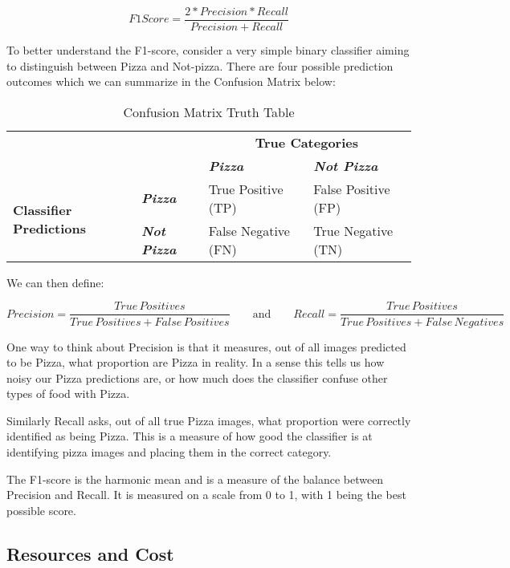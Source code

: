 \documentclass[10pt,a4paper]{article}
\begin{document}
\[F1 Score = \frac{2 * Precision * Recall}{Precision + Recall}\]

To better understand the F1-score, consider a very simple binary classifier aiming to distinguish between Pizza and Not-pizza. There are four possible prediction outcomes which we can summarize in the Confusion Matrix below:

	\begin{table}[h]
	\small
	\setlength\extrarowheight{7pt}
    \begin{tabular}{ p{2.8cm} l l l}  
    ~                      & ~         & \multicolumn{2}{c}{\textbf{True Categories}} \\
    ~                      & ~         & \textbf{\textit{Pizza}}	& \textbf{\textit{Not Pizza}} \\
    \hline
    \multirow{2}{2.8cm}{\textbf{Classifier Predictions}} & \textbf{\textit{Pizza}} & True Positive (TP)  & False Positive (FP) \\
                        & \textbf{\textit{Not Pizza}} & False Negative (FN) & True Negative (TN)  \\
	\hline    
    \end{tabular}
    \caption{Confusion Matrix Truth Table}
    \end{table}

We can then define:

\[
Precision = \frac{True\, Positives}{True\, Positives + False\, Positives}
\qquad\text{and}\qquad
Recall = \frac{True\, Positives}{True\, Positives + False\, Negatives}
\]

One way to think about Precision is that it measures, out of all images predicted to be Pizza, what proportion are Pizza in reality. In a sense this tells us how noisy our Pizza predictions are, or how much does the classifier confuse other types of food with Pizza.

Similarly Recall asks, out of all true Pizza images, what proportion were correctly identified as being Pizza. This is a measure of how good the classifier is at identifying pizza images and placing them in the correct category.

The F1-score is the harmonic mean and is a measure of the balance between Precision and Recall. It is measured on a scale from 0 to 1, with 1 being the best possible score.

\subsection*{Resources and Cost}
\end{document}

